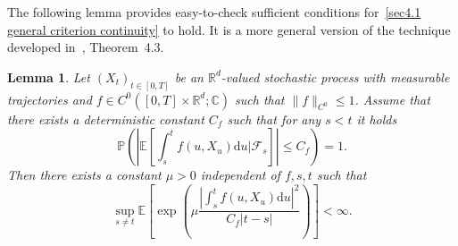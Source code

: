 \documentclass[10pt]{article}
\newcommand{\mathd}{\mathrm{d}}
\newtheorem{lemma}[theorem]{Lemma}
\begin{document}
The following lemma provides easy\mbox{-}to\mbox{-}check sufficient conditions
for~\eqref{sec4.1 general criterion continuity} to hold. It is a more general
version of the technique developed in~{\cite{catelliergubinelli}},
Theorem~4.3.

\begin{lemma}
  \label{sec4.1 lemma condition rho irr}Let $(X_t)_{t \in [0, T]}$ be an
  $\mathbb{R}^d$-valued stochastic process with measurable trajectories and $f
  \in C^0 ([0, T] \times \mathbb{R}^d ; \mathbb{C})$ such that $\| f \|_{C^0}
  \leqslant 1$. Assume that there exists a deterministic constant $C_f$ such
  that for any $s < t$ it holds
  \begin{equation}
    \mathbb{P} \left( \left| \mathbb{E} \left[ \int_s^t f (u, X_u) \mathd u |
    \mathcal{F}_s \right] \right| \leqslant C_f \right) = 1.
  \end{equation}
  Then there exists a constant $\mu > 0$ independent of $f, s, t$ such that
  \begin{equation}
    \sup_{s \neq t} \mathbb{E} \left[ \exp \left( \mu \frac{\left| \int_s^t f
    (u, X_u) \mathd u \right|^2}{C_f  | t - s |} \right) \right] < \infty
    \label{sec4.1 exp estimate lemma} .
  \end{equation}
\end{lemma}
\end{document}
